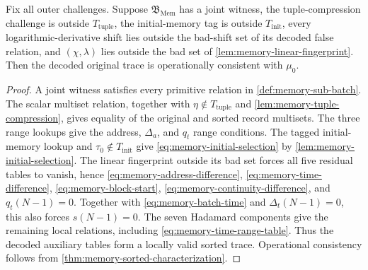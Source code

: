 \begin{lemma}
\label{lem:memory-joint-witness}
Fix all outer challenges.  Suppose $\mathfrak B_{\mathrm{Mem}}$ has a joint witness, the tuple-compression challenge is outside $T_{\mathrm{tuple}}$, the initial-memory tag is outside $T_{\mathrm{init}}$, every logarithmic-derivative shift lies outside the bad-shift set of its decoded false relation, and $(\chi,\lambda)$ lies outside the bad set of \cref{lem:memory-linear-fingerprint}.  Then the decoded original trace is operationally consistent with $\mu_0$.
\end{lemma}

\begin{proof}
A joint witness satisfies every primitive relation in \cref{def:memory-sub-batch}.  The scalar multiset relation, together with $\eta\notin T_{\mathrm{tuple}}$ and \cref{lem:memory-tuple-compression}, gives equality of the original and sorted record multisets.  The three range lookups give the address, $\Delta_a$, and $q_t$ range conditions.  The tagged initial-memory lookup and $\tau_0\notin T_{\mathrm{init}}$ give \eqref{eq:memory-initial-selection} by \cref{lem:memory-initial-selection}.  The linear fingerprint outside its bad set forces all five residual tables to vanish, hence \eqref{eq:memory-address-difference}, \eqref{eq:memory-time-difference}, \eqref{eq:memory-block-start}, \eqref{eq:memory-continuity-difference}, and $q_t(N-1)=0$.  Together with \eqref{eq:memory-batch-time} and $\Delta_t(N-1)=0$, this also forces $s(N-1)=0$.  The seven Hadamard components give the remaining local relations, including \eqref{eq:memory-time-range-table}.  Thus the decoded auxiliary tables form a locally valid sorted trace.  Operational consistency follows from \cref{thm:memory-sorted-characterization}.
\end{proof}

